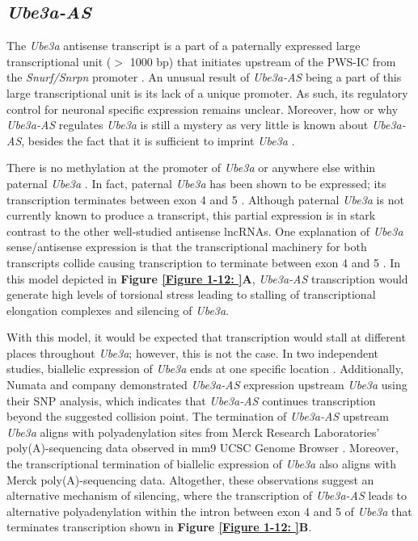 {\subsection{\textit{Ube3a-AS}}

The \textit{Ube3a} antisense transcript is a part of a paternally expressed large transcriptional unit ($>$ 1000 bp) that initiates upstream of the PWS-IC from the \textit{Snurf/Snrpn} promoter \cite{Landers2004,Runte2004}. An unusual result of \textit{Ube3a-AS} being a part of this large transcriptional unit is its lack of a unique promoter. As such, its regulatory control for neuronal specific expression remains unclear. Moreover, how or why \textit{Ube3a-AS} regulates \textit{Ube3a} is still a mystery as very little is known about \textit{Ube3a-AS}, besides the fact that it is sufficient to imprint \textit{Ube3a} \cite{Chamberlain2001,Meng2012,Powell2013}.

There is no methylation at the promoter of \textit{Ube3a} or anywhere else within paternal \textit{Ube3a} \cite{Chamberlain2001,Dindot2009,Kishino2006}. In fact, paternal \textit{Ube3a} has been shown to be expressed; its transcription terminates between exon 4 and 5 \cite{Meng2013,Numata2011}. Although paternal \textit{Ube3a} is not currently known to produce a transcript, this partial expression is in stark contrast to the other well-studied antisense lncRNAs. One explanation of \textit{Ube3a} sense/antisense expression is that the transcriptional machinery for both transcripts collide causing transcription to terminate between exon 4 and 5 \cite{Meng2013}. In this model depicted in \textbf{Figure \ref{Figure 1-12: }A}, \textit{Ube3a-AS} transcription would generate high levels of torsional stress leading to stalling of transcriptional elongation complexes and silencing of \textit{Ube3a}.

With this model, it would be expected that transcription would stall at different places throughout \textit{Ube3a}; however, this is not the case. In two independent studies, biallelic expression of \textit{Ube3a} ends at one specific location \cite{Meng2013,Numata2011}. Additionally, Numata and company demonstrated \textit{Ube3a-AS} expression upstream \textit{Ube3a} using their SNP analysis, which indicates that \textit{Ube3a-AS} continues transcription beyond the suggested collision point. The termination of \textit{Ube3a-AS} upstream \textit{Ube3a} aligns with polyadenylation sites from Merck Research Laboratories’ poly(A)-sequencing data observed in mm9 UCSC Genome Browser \cite{Kent2002}. Moreover, the transcriptional termination of biallelic expression of \textit{Ube3a} also aligns with Merck poly(A)-sequencing data. Altogether, these observations suggest an alternative mechanism of silencing, where the transcription of \textit{Ube3a-AS} leads to alternative polyadenylation within the intron between exon 4 and 5 of \textit{Ube3a} that terminates transcription shown in \textbf{Figure \ref{Figure 1-12: }B}.

}

